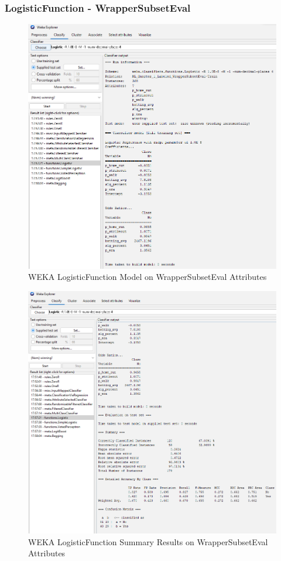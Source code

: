 \documentclass[12pt]{article}
\begin{document}
\subsubsection{LogisticFunction - WrapperSubsetEval}
\begin{figure}[h!]
    \includegraphics[scale=0.4]{./images/WrapperSubsetEval/LogisticFunction-Model.png}
\centering
    \caption{WEKA LogisticFunction Model on WrapperSubsetEval Attributes}
\end{figure}
\newpage
\begin{figure}[h!]
    \includegraphics[scale=0.4]{./images/WrapperSubsetEval/LogisticFunction-Summary.png}
\centering
    \caption{WEKA LogisticFunction Summary Results on WrapperSubsetEval Attributes}
\end{figure}
\end{document}
